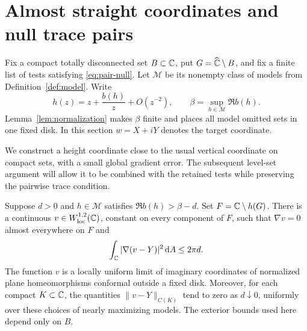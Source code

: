 \section{Almost straight coordinates and null trace pairs}
\label{sec:conductivity}

Fix a compact totally disconnected set $B\subset\mathbb C$, put
$G=\widehat{\mathbb C}\setminus B$, and fix a finite list of tests satisfying
\eqref{eq:pair-null}. Let $\mathcal M$ be its nonempty class of models
from Definition~\ref{def:model}. Write
\[
 h(z)=z+\frac{b(h)}z+O(z^{-2}),\qquad
 \beta=\sup_{h\in\mathcal M}\Re b(h).
\]
Lemma~\ref{lem:normalization} makes $\beta$ finite and places all model
omitted sets in one fixed disk. In this section $w=X+iY$ denotes the
target coordinate.

We construct a height coordinate close to the usual vertical coordinate
on compact sets, with a small global gradient error.
The subsequent level-set argument will allow it to be combined with the
retained tests while preserving the pairwise trace condition.

\begin{proposition}\label{prop:height}
Suppose $d>0$ and $h\in\mathcal M$ satisfies $\Re b(h)>\beta-d$.
Set $F=\mathbb C\setminus h(G)$. There is a continuous
$v\in W^{1,2}_{\mathrm{loc}}(\mathbb C)$, constant on every component of $F$, such that
$\nabla v=0$ almost everywhere on $F$ and
\begin{equation}\label{eq:height-energy}
 \int_{\mathbb C}|\nabla(v-Y)|^2\,\mathrm d A\le 2\pi d.
\end{equation}
The function $v$ is a locally uniform limit of imaginary coordinates of
normalized plane homeomorphisms conformal outside a fixed disk.
Moreover, for each compact $K\subset\mathbb C$, the quantities
$\|v-Y\|_{C(K)}$ tend to zero as $d\downarrow0$, uniformly over these
choices of nearly maximizing models. The exterior bounds used here
depend only on $B$.
\end{proposition}

